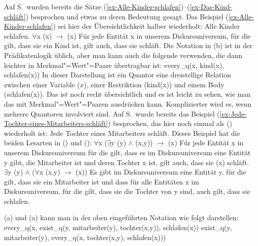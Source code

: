 Auf S.\,\pageref{ex-Alle-Kinder-schlafen} wurden bereits die Sätze
(\ref{ex-Alle-Kinder-schlafen})--(\ref{ex-Das-Kind-schläft}) besprochen und etwas zu deren Bedeutung
gesagt. Das Beispiel (\ref{ex-Alle-Kinder-schlafen}) sei hier der Übersichtlichkeit halber wiederholt:
\eal
\label{ex-Alle-Kinder-schlafen-zwei}
\ex Alle Kinder schlafen.
\ex $\forall$x (x) $\to$ (x)
\ex Für jede Entität x in unserem Diskursuniversum, für die gilt, dass sie ein Kind ist, gilt auch,
dass sie schläft.
\zl
Die Notation in (b) ist in der Prädikatenlogik üblich, aber man kann auch die folgende verwenden, die
dann leichter in Merkmal"=Wert"=Paare übertragbar ist:
\ea
\label{ex-every-kind-schlafen}
every\_q(x, kind(x), schlafen(x))
\z
In dieser Darstellung ist ein Quantor eine dreistellige Relation zwischen einer Variable ($x$),
einer Restriktion (kind(x)) und einem Body (schlafen(x)). Das ist noch recht übersichtlich und es
ist leicht zu sehen, wie man das mit Merkmal"=Wert"=Paaren ausdrücken kann. Komplizierter wird es,
wenn mehrere Quantoren involviert sind. Auf S.\,\pageref{ex-Jede-Tochter-eines-Mitarbeiters-schläft} wurde bereits das Beispiel
(\ref{ex-Jede-Tochter-eines-Mitarbeiters-schläft}) besprochen, das hier noch einmal als ()
wiederholt ist:
\ea
\label{ex-Jede-Tochter-eines-Mitarbeiters-schläft-zwei}
Jede Tochter eines Mitarbeiters schläft.
\z
Dieses Beispiel hat die beiden Lesarten in () und ():
\eal
\ex $\forall$x ($\exists$y (y) $\wedge$ (x,y)) $\to$
(x)
\ex Für jede Entität x in unserem Diskursuniversum für die gilt, dass es im Diskursuniversum eine Entität y gibt, die
Mitarbeiter ist und deren Tochter x ist, gilt auch, dass sie (x) schläft.
\zl
\eal
\ex $\exists$y (y) $\wedge$ ($\forall$x (x,y) $\to$
(x))
\ex Es gibt im Diskursuniversum eine Entität y, für die gilt, dass sie ein Mitarbeiter ist und dass für alle Entitäten
x im Diskursuniversum, für die gilt, dass sie die Tochter von y sind, auch gilt, dass sie schlafen.
\zl

\noindent
(a) und (a) kann man in der oben eingeführten Notation wie folgt darstellen:
\eal
\label{ex-Quantoren-Mitarbeiter-Tochter}
\ex every\_q(x, exist\_q(y, mitarbeiter(y), tochter(x,y)), schlafen(x))
\ex exist\_q(y, mitarbeiter(y), every\_q(x, tochter(x,y), schlafen(x)))
\zl 

